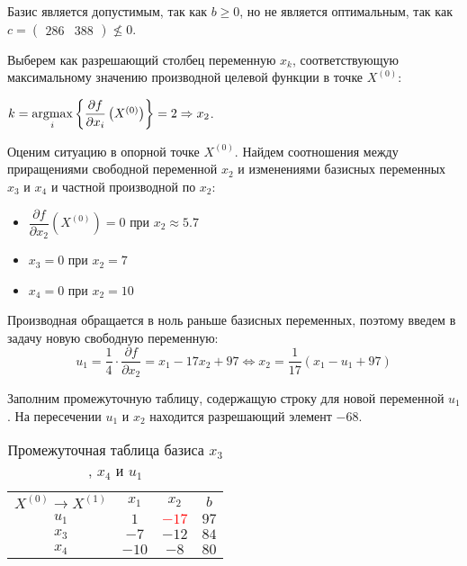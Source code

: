 Базис является допустимым, так как $b \geq 0$, но не является оптимальным, так как $c = \begin{pmatrix} 286 & 388 \end{pmatrix} \nleqslant 0$.

Выберем как разрешающий столбец переменную $x_k	$, соответствующую максимальному значению производной целевой функции в точке $X^{(0)}$: 

$k = \operatorname*{argmax}\limits_i\left\{\dfrac{\partial f}{\partial x_i}\left(X^{(0)}\right)\right\} = 2 \Rightarrow x_2$.

Оценим ситуацию в опорной точке $X^{(0)}$. Найдем соотношения между приращениями свободной переменной $x_2$ и изменениями базисных переменных $x_3$ и $x_4$ и частной производной по $x_2$:
\begin{itemize}
	\item $\dfrac{\partial f}{\partial x_2}\left(X^{(0)}\right) = 0$ при $x_2 \approx 5.7$
	\item $x_3 = 0$ при $x_2 = 7$
	\item $x_4 = 0$ при $x_2 = 10$
\end{itemize}

Производная обращается в ноль раньше базисных переменных, поэтому введем в задачу новую свободную переменную:
\begin{equation*}
	u_1 = \frac{1}{4} \cdot \frac{\partial f}{\partial x_2} = x_1 - 17 x_2 + 97
	\Longleftrightarrow
	x_2 = \frac{1}{17} \left(x_1 - u_1 + 97\right)
\end{equation*}

Заполним промежуточную таблицу, содержащую строку для новой переменной $u_1$. На пересечении $u_1$ и $x_2$ находится разрешающий элемент $-68$. 
\begin{table}[H]
\begin{center}
	\def\tabcolsep{25pt}
	\def\arraystretch{1.3}
	\caption{Промежуточная таблица базиса $x_3$, $x_4$ и $u_1$}
	\begin{tabular}{|c||c|c||c|}
		\hline
		$X^{(0)} \to X^{(1)}$ & $x_1$ & $x_2$ & $b$ \\ 
		\hhline{|=#==#=|}
		$u_1$ & $1$ & \textcolor{red}{\boldmath$-17$} & $97$ \\ 
		\hline
		$x_3$ & $-7$ & $-12$ & $84$ \\ 
		\hline
		$x_4$ & $-10$ & $-8$ & $80$ \\ 
		\hline
	\end{tabular}
\end{center}
\end{table}

